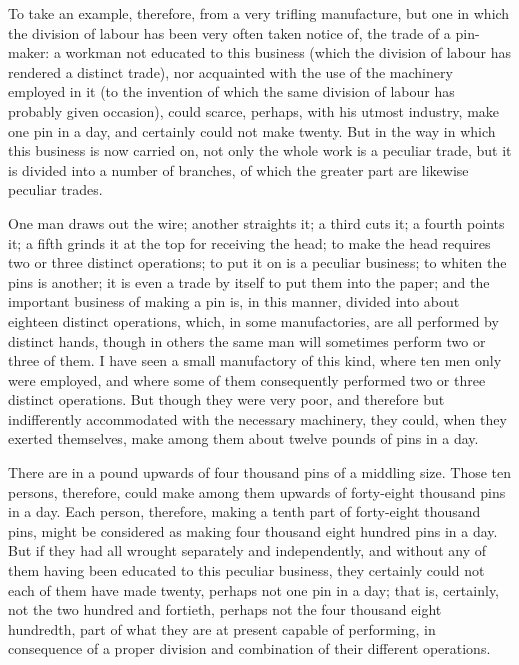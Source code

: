 To take an example, therefore, from a very trifling manufacture, but one in which the division of labour has been very often taken notice of, the trade of a pin-maker: a workman not educated to this business (which the division of labour has rendered a distinct trade), nor acquainted with the use of the machinery employed in it (to the invention of which the same division of labour has probably given occasion), could scarce, perhaps, with his utmost industry, make one pin in a day, and certainly could not make twenty. But in the way in which this business is now carried on, not only the whole work is a peculiar trade, but it is divided into a number of branches, of which the greater part are likewise peculiar trades.\par

One man draws out the wire; another straights it; a third cuts it; a fourth points it; a fifth grinds it at the top for receiving the head; to make the head requires two or three distinct operations; to put it on is a peculiar business; to whiten the pins is another; it is even a trade by itself to put them into the paper; and the important business of making a pin is, in this manner, divided into about eighteen distinct operations, which, in some manufactories, are all performed by distinct hands, though in others the same man will sometimes perform two or three of them. I have seen a small manufactory of this kind, where ten men only were employed, and where some of them consequently performed two or three distinct operations. But though they were very poor, and therefore but indifferently accommodated with the necessary machinery, they could, when they exerted themselves, make among them about twelve pounds of pins in a day.\par

There are in a pound upwards of four thousand pins of a middling size. Those ten persons, therefore, could make among them upwards of forty-eight thousand pins in a day. Each person, therefore, making a tenth part of forty-eight thousand pins, might be considered as making four thousand eight hundred pins in a day. But if they had all wrought separately and independently, and without any of them having been educated to this peculiar business, they certainly could not each of them have made twenty, perhaps not one pin in a day; that is, certainly, not the two hundred and fortieth, perhaps not the four thousand eight hundredth, part of what they are at present capable of performing, in consequence of a proper division and combination of their different operations.\par

